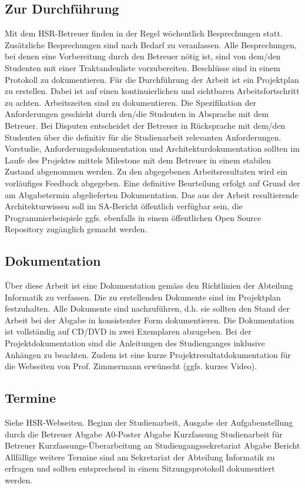  \subsection{Zur Durchführung}
Mit dem HSR-Betreuer finden in der Regel wöchentlich Besprechungen statt. Zusätzliche Besprechungen sind nach Bedarf zu veranlassen. 
Alle Besprechungen, bei denen eine Vorbereitung durch den Betreuer nötig ist, sind von dem/den Studenten mit einer Traktandenliste vorzubereiten. Beschlüsse sind in einem Protokoll zu dokumentieren.
Für die Durchführung der Arbeit ist ein Projektplan zu erstellen. Dabei ist auf einen kontinuierlichen und sichtbaren Arbeitsfortschritt zu achten. Arbeitszeiten sind zu dokumentieren. 
Die Spezifikation der Anforderungen geschieht durch den/die Studenten in Absprache mit dem Betreuer. Bei Disputen entscheidet der Betreuer in Rücksprache mit dem/den Studenten über die definitiv für die Studienarbeit relevanten Anforderungen.  
Vorstudie, Anforderungsdokumentation und Architekturdokumentation sollten im Laufe des Projektes mittels Milestone mit dem Betreuer in einem stabilen Zustand abgenommen werden. Zu den abgegebenen Arbeitsresultaten wird ein vorläufiges Feedback abgegeben. Eine definitive Beurteilung erfolgt auf Grund der am Abgabetermin abgelieferten Dokumentation.
Das aus der Arbeit resultierende Architekturwissen soll im SA-Bericht öffentlich verfügbar sein, die Programmierbeispiele ggfs. ebenfalls in einem öffentlichen Open Source Repository zugänglich gemacht werden. 
\subsection{Dokumentation}
Über diese Arbeit ist eine Dokumentation gemäss den Richtlinien der Abteilung Informatik zu verfassen. Die zu erstellenden Dokumente sind im Projektplan festzuhalten. Alle Dokumente sind nachzuführen, d.h. sie sollten den Stand der Arbeit bei der Abgabe in konsistenter Form dokumentieren. Die Dokumentation ist vollständig auf CD/DVD in zwei Exemplaren abzugeben. Bei der Projektdokumentation sind die Anleitungen des Studienganges inklusive Anhängen zu beachten. Zudem ist eine kurze Projektresultatdokumentation für die Webseiten von Prof. Zimmermann erwünscht (ggfs. kurzes Video).
 \subsection{Termine} 
Siehe HSR-Webseiten.
 Beginn der Studienarbeit, 
Ausgabe der Aufgabenstellung durch die Betreuer
 Abgabe A0-Poster
 Abgabe Kurzfassung Studienarbeit für Betreuer
 Kurzfassungs-Überarbeitung an Studiengangssekretariat
 Abgabe Bericht
 Allfällige weitere Termine sind am Sekretariat der Abteilung Informatik zu erfragen und sollten entsprechend in einem Sitzungsprotokoll dokumentiert werden. 
